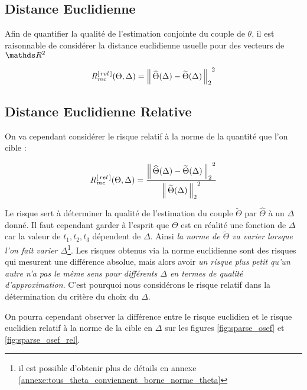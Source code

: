 \subsection{Distance Euclidienne}

Afin de quantifier la qualité de l'estimation conjointe du couple de $\theta$, il est raisonnable de considérer la distance euclidienne usuelle pour des vecteurs de $\R 2$

\begin{equation*}
	R^{[\,rel\,]}_{mc}(\Theta, \Delta) = {\distnorme 2 {\widehat \Theta(\Delta)} {\widetilde \Theta(\Delta)}}^2
\end{equation*}

\subsection{Distance Euclidienne Relative}

On va cependant considérer le risque relatif à la norme de la quantité que l'on cible :

\begin{equation*}
	R^{[\,rel\,]}_{mc}(\Theta, \Delta) =\frac{ {\distnorme 2 {\widehat \Theta(\Delta)} {\widetilde \Theta(\Delta)}}^2}{ {\norme 2 {\widetilde \Theta(\Delta)}}^2 }
\end{equation*}


Le risque sert à déterminer la qualité de l'estimation du couple $\widetilde \Theta$ par $\widehat \Theta$ à un $\Delta$ donné. Il faut cependant garder à l'esprit que $\Theta$ est en réalité une fonction de $\Delta$ car la valeur de $t_1, t_2, t_3$ dépendent de $\Delta$. Ainsi \emph{la norme de $\widetilde \Theta$ va varier lorsque l'on fait varier $\Delta$}\footnote{il est possible d'obtenir plus de détails en annexe \ref{annexe:tous_theta_conviennent_borne_norme_theta}}. Les risques obtenus via la norme euclidienne sont des risques qui mesurent une différence absolue, mais alors avoir \emph{un risque plus petit qu'un autre n'a pas le même sens pour différents $\Delta$ en termes de qualité d'approximation}. C'est pourquoi nous considérons le risque relatif dans la détermination du critère du choix du $\Delta$.

On pourra cependant observer la différence entre le risque euclidien et le risque euclidien relatif à la norme de la cible en $\Delta$ sur les figures \ref{fig:sparse_osef} et \ref{fig:sparse_osef_rel}.
